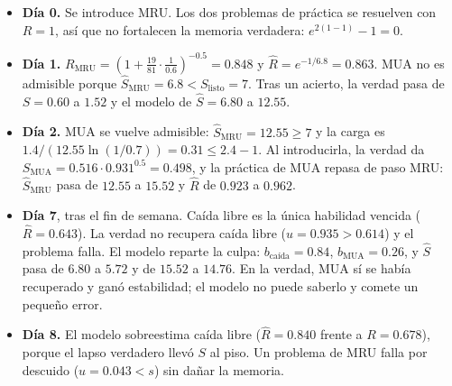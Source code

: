 \documentclass[11pt]{article}
\theoremstyle{definition}
\theoremstyle{remark}
\newcommand{\Rh}{\hat R}
\newcommand{\Sh}{\hat S}
\newcommand{\Slisto}{S_{\mathrm{listo}}}
\begin{document}
\begin{itemize}
\item \textbf{Día 0.} Se introduce MRU. Los dos problemas de práctica se resuelven con $R=1$, así que no fortalecen la memoria verdadera: $e^{2(1-1)}-1=0$.
\item \textbf{Día 1.} $R_{\text{MRU}}=(1+\tfrac{19}{81}\cdot\tfrac{1}{0.6})^{-0.5}=0.848$ y $\Rh=e^{-1/6.8}=0.863$. MUA no es admisible porque $\Sh_{\text{MRU}}=6.8<\Slisto=7$. Tras un acierto, la verdad pasa de $S=0.60$ a $1.52$ y el modelo de $\Sh=6.80$ a $12.55$.
\item \textbf{Día 2.} MUA se vuelve admisible: $\Sh_{\text{MRU}}=12.55\ge7$ y la carga es $1.4/(12.55\ln(1/0.7))=0.31\le2.4-1$. Al introducirla, la verdad da $S_{\text{MUA}}=0.516\cdot0.931^{0.5}=0.498$, y la práctica de MUA repasa de paso MRU: $\Sh_{\text{MRU}}$ pasa de $12.55$ a $15.52$ y $\Rh$ de $0.923$ a $0.962$.
\item \textbf{Día 7}, tras el fin de semana. Caída libre es la única habilidad vencida ($\Rh=0.643$). La verdad no recupera caída libre ($u=0.935>0.614$) y el problema falla. El modelo reparte la culpa: $b_{\text{caída}}=0.84$, $b_{\text{MUA}}=0.26$, y $\Sh$ pasa de $6.80$ a $5.72$ y de $15.52$ a $14.76$. En la verdad, MUA sí se había recuperado y ganó estabilidad; el modelo no puede saberlo y comete un pequeño error.
\item \textbf{Día 8.} El modelo sobreestima caída libre ($\Rh=0.840$ frente a $R=0.678$), porque el lapso verdadero llevó $S$ al piso. Un problema de MRU falla por descuido ($u=0.043<s$) sin dañar la memoria.
\end{itemize}
\end{document}
